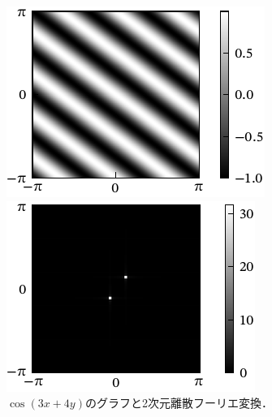 \documentclass[../../main]{subfiles}
\begin{document}
\begin{figure}[htbp]
  \begin{minipage}{\linewidth/2}
    \centering
    \includegraphics{figures/2dcos.pdf}
    \end{minipage}%
  \begin{minipage}{\linewidth/2}
    \centering
    \includegraphics{figures/2dcos_dft.pdf}
  \end{minipage}
  \caption{\(\cos(3x+4y)\)のグラフと2次元離散フーリエ変換．}
\end{figure}
\end{document}
